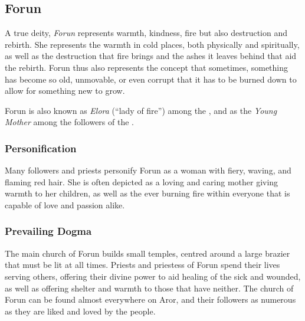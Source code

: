 \clearpage
{}
\clearpage

\subsection{Forun}
\label{sec:Forun}

A true deity, \emph{Forun} represents warmth, kindness, fire but also
destruction and rebirth. She represents the warmth in cold places, both
physically and spiritually, as well as the destruction that fire brings and
the ashes it leaves behind that aid the rebirth. Forun thus also represents
the concept that sometimes, something has become so old, unmovable, or even
corrupt that it has to be burned down to allow for something new to grow.

Forun is also known as \emph{Elora} (``lady of fire'') among the
, and as the \emph{Young Mother} among the followers of
the .

\subsubsection*{Personification}

Many followers and priests personify Forun as a woman with fiery, waving, and
flaming red hair. She is often depicted as a loving and caring mother giving
warmth to her children, as well as the ever burning fire within everyone that
is capable of love and passion alike.

\subsubsection*{Prevailing Dogma}

The main church of Forun builds small temples, centred around a large brazier
that must be lit at all times. Priests and priestess of Forun spend their
lives serving others, offering their divine power to aid healing of the sick
and wounded, as well as offering shelter and warmth to those that have
neither. The church of Forun can be found almost everywhere on Aror, and their
followers as numerous as they are liked and loved by the people.

